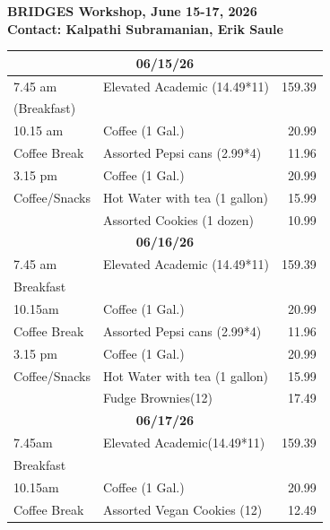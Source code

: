 \documentclass[12pt]{article}
\begin{document}
\begin{center}
\textbf{BRIDGES Workshop, June 15-17, 2026 \\
	Contact: Kalpathi Subramanian, Erik Saule} 
\end{center}

\begin{table}[htp]
\begin{tabular}{|l|l|r|} \hline
\multicolumn{3}{|c|}{\textbf{06/15/26}} \\ \hline
7.45 am     & Elevated Academic (14.49*11) & 159.39\\  
(Breakfast)	&  &  \\\hline

10.15 am &  Coffee (1 Gal.)& 20.99\\
Coffee Break & Assorted Pepsi cans (2.99*4) & 11.96 \\ \hline 

3.15 pm  & Coffee (1 Gal.)& 20.99\\
Coffee/Snacks &  Hot Water with tea (1 gallon) &  15.99 \\
              & Assorted Cookies (1 dozen) & 10.99 \\\hline

\multicolumn{3}{|c|}{\textbf{06/16/26}} \\ \hline
7.45 am & Elevated Academic (14.49*11) & 159.39\\ 
Breakfast & & \\ \hline

10.15am & Coffee (1 Gal.)& 20.99\\
Coffee Break & Assorted Pepsi cans (2.99*4) & 11.96 \\ \hline 

3.15 pm  & Coffee (1 Gal.)& 20.99\\
Coffee/Snacks &  Hot Water with tea (1 gallon) &  15.99 \\
              & Fudge Brownies(12) & 17.49 \\\hline

\multicolumn{3}{|c|}{\textbf{06/17/26}} \\ \hline
7.45am		& Elevated Academic(14.49*11) & 159.39\\  
Breakfast	&  & \\\hline
10.15am & Coffee (1 Gal.)& 20.99\\
Coffee Break & Assorted Vegan Cookies (12) & 12.49 \\ \hline 
\end{tabular}
\end{table}
\end{document}
